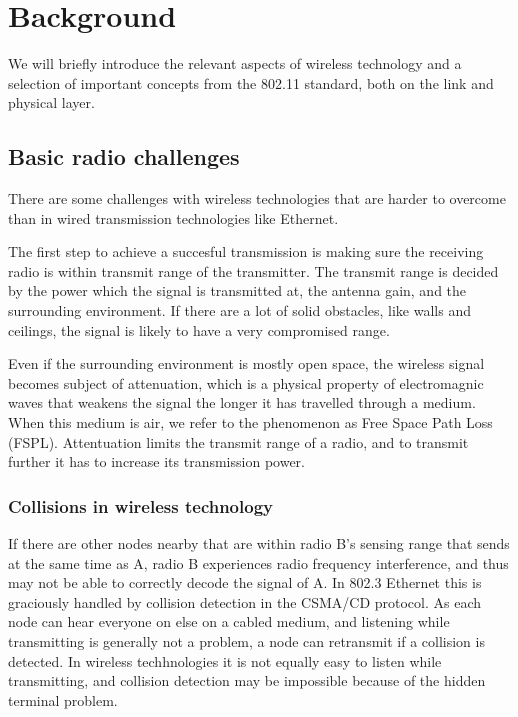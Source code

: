 \chapter{Background}
We will briefly introduce the relevant aspects of wireless technology and a selection of important
concepts from the 802.11 standard, both on the link and physical layer.

\section{Basic radio challenges}
There are some challenges with wireless technologies that are harder to overcome than in wired transmission technologies like Ethernet.

The first step to achieve a succesful transmission is making sure the receiving radio is within transmit range of the transmitter. The
transmit range is decided by the power which the signal is transmitted at, the antenna gain, and the surrounding 
environment. If there are a lot of solid obstacles, like walls and ceilings, the signal is likely to have a very compromised range.

Even if the surrounding environment is mostly open space, the wireless signal becomes subject of attenuation,
     which is a physical property of electromagnic waves that weakens the signal the longer it has travelled through a
     medium. When this medium is air, we refer to the phenomenon as Free Space Path Loss (FSPL). Attentuation limits
     the transmit range of a radio, and to transmit further it has to increase its transmission power.

     \subsection{Collisions in wireless technology}
     If there are other nodes nearby that are within radio B's sensing range that sends at the same time as A, 
     radio B experiences radio frequency interference, and thus may not be able to correctly decode the signal of A. In 802.3 Ethernet this
     is graciously handled by collision detection in the CSMA/CD protocol. As each node can hear everyone on else on a cabled medium,
     and listening while transmitting is generally not a problem, a node can retransmit if a collision is detected. In wireless techhnologies
     it is not equally easy to listen while transmitting, and collision detection may be impossible because of the hidden terminal problem.

